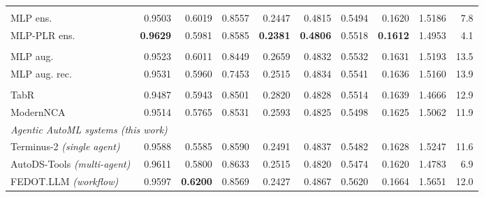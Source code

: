 \begin{table}[t]
\begin{tabular}{lrrrrrrrrr}
\addlinespace[2pt]
\multicolumn{10}{l}{\itshape Ensembles} \\
MLP ens. & 0.9503 & 0.6019 & 0.8557 & 0.2447 & 0.4815 & 0.5494 & 0.1620 & 1.5186 & 7.8 \\
MLP-PLR ens. & \textbf{0.9629} & 0.5981 & 0.8585 & \textbf{0.2381} & \textbf{0.4806} & 0.5518 & \textbf{0.1612} & 1.4953 & 4.1 \\
\addlinespace[2pt]
\multicolumn{10}{l}{\itshape Training methodologies} \\
MLP aug. & 0.9523 & 0.6011 & 0.8449 & 0.2659 & 0.4832 & 0.5532 & 0.1631 & 1.5193 & 13.5 \\
MLP aug. rec. & 0.9531 & 0.5960 & 0.7453 & 0.2515 & 0.4834 & 0.5541 & 0.1636 & 1.5160 & 13.9 \\
\addlinespace[2pt]
\multicolumn{10}{l}{\itshape Retrieval-augmented} \\
TabR & 0.9487 & 0.5943 & 0.8501 & 0.2820 & 0.4828 & 0.5514 & 0.1639 & 1.4666 & 12.9 \\
ModernNCA & 0.9514 & 0.5765 & 0.8531 & 0.2593 & 0.4825 & 0.5498 & 0.1625 & 1.5062 & 11.9 \\
\midrule
\multicolumn{10}{l}{\itshape Agentic AutoML systems (this work)} \\
Terminus-2 \emph{(single agent)} & 0.9588 & 0.5585 & 0.8590 & 0.2491 & 0.4837 & 0.5482 & 0.1628 & 1.5247 & 11.6 \\
AutoDS-Tools \emph{(multi-agent)} & 0.9611 & 0.5800 & 0.8633 & 0.2515 & 0.4820 & 0.5474 & 0.1620 & 1.4783 & 6.9 \\
FEDOT.LLM \emph{(workflow)} & 0.9597 & \textbf{0.6200} & 0.8569 & 0.2427 & 0.4867 & 0.5620 & 0.1664 & 1.5651 & 12.0 \\
\bottomrule
\end{tabular}
\end{table}
